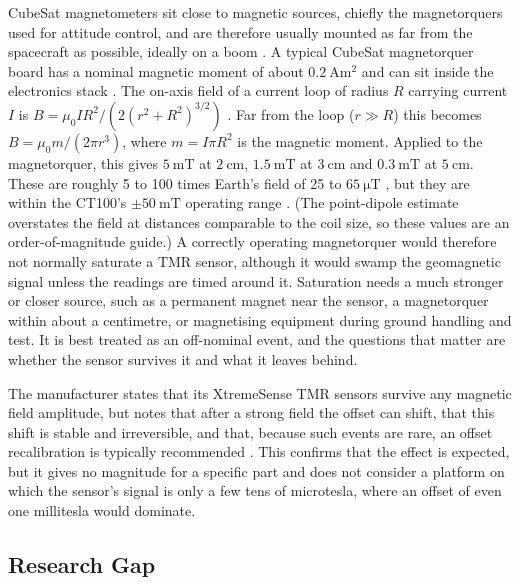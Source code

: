 \documentclass[12pt,a4paper]{article}
\begin{document}
CubeSat magnetometers sit close to magnetic sources, chiefly the magnetorquers used for attitude control, and are therefore usually mounted as far from the spacecraft as possible, ideally on a boom \cite{nss_magnetometer}. A typical CubeSat magnetorquer board has a nominal magnetic moment of about $\SI{0.2}{\ampere\metre\squared}$ and can sit inside the electronics stack \cite{isis_imtq}. The on-axis field of a current loop of radius $R$ carrying current $I$ is $B = \mu_0 I R^2 / \left(2(r^2+R^2)^{3/2}\right)$ \cite{openstax_up2}. Far from the loop ($r \gg R$) this becomes $B = \mu_0 m / (2\pi r^3)$, where $m = I\pi R^2$ is the magnetic moment. Applied to the magnetorquer, this gives $\SI{5}{\milli\tesla}$ at $\SI{2}{\centi\metre}$, $\SI{1.5}{\milli\tesla}$ at $\SI{3}{\centi\metre}$ and $\SI{0.3}{\milli\tesla}$ at $\SI{5}{\centi\metre}$. These are roughly 5 to 100 times Earth's field of 25 to $\SI{65}{\micro\tesla}$ \cite{wmm}, but they are within the CT100's $\pm\SI{50}{\milli\tesla}$ operating range \cite{ct100_datasheet}. (The point-dipole estimate overstates the field at distances comparable to the coil size, so these values are an order-of-magnitude guide.) A correctly operating magnetorquer would therefore not normally saturate a TMR sensor, although it would swamp the geomagnetic signal unless the readings are timed around it. Saturation needs a much stronger or closer source, such as a permanent magnet near the sensor, a magnetorquer within about a centimetre, or magnetising equipment during ground handling and test. It is best treated as an off-nominal event, and the questions that matter are whether the sensor survives it and what it leaves behind.

The manufacturer states that its XtremeSense TMR sensors survive any magnetic field amplitude, but notes that after a strong field the offset can shift, that this shift is stable and irreversible, and that, because such events are rare, an offset recalibration is typically recommended \cite{allegro_an133}. This confirms that the effect is expected, but it gives no magnitude for a specific part and does not consider a platform on which the sensor's signal is only a few tens of microtesla, where an offset of even one millitesla would dominate.

\subsection{Research Gap}
\label{sec:gap}
\end{document}
